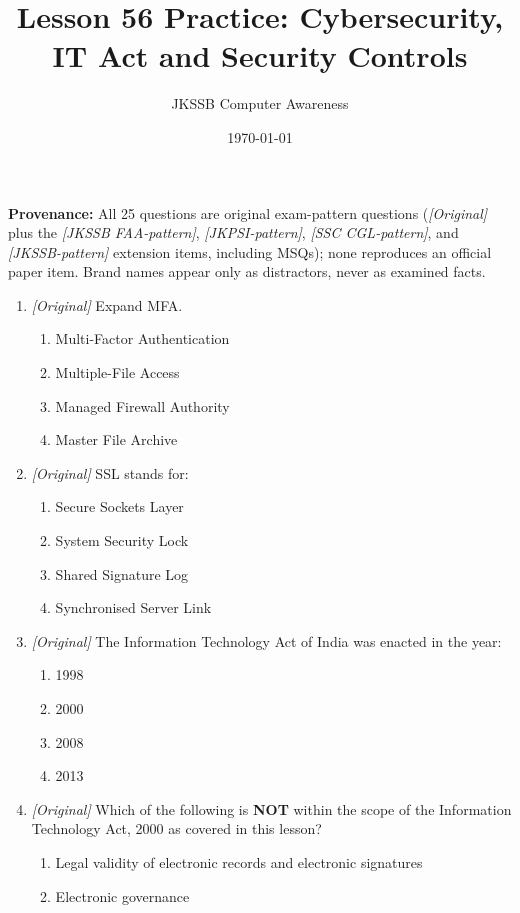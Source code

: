 \documentclass[11pt]{article}
\title{Lesson 56 Practice: Cybersecurity, IT Act and Security Controls}
\author{JKSSB Computer Awareness}
\date{\today}
\begin{document}
\maketitle
\noindent\textbf{Provenance:} All 25 questions are original exam-pattern questions (\textit{[Original]} plus the \textit{[JKSSB FAA-pattern]}, \textit{[JKPSI-pattern]}, \textit{[SSC CGL-pattern]}, and \textit{[JKSSB-pattern]} extension items, including MSQs); none reproduces an official paper item.
Brand names appear only as distractors, never as examined facts.

\begin{enumerate}[label=\textbf{Q\arabic*.}, leftmargin=*]
\item \textit{[Original]} Expand MFA.
  \begin{enumerate}[label=\Alph*.]
    \item Multi-Factor Authentication
    \item Multiple-File Access
    \item Managed Firewall Authority
    \item Master File Archive
  \end{enumerate}
\item \textit{[Original]} SSL stands for:
  \begin{enumerate}[label=\Alph*.]
    \item Secure Sockets Layer
    \item System Security Lock
    \item Shared Signature Log
    \item Synchronised Server Link
  \end{enumerate}
\item \textit{[Original]} The Information Technology Act of India was
  enacted in the year:
  \begin{enumerate}[label=\Alph*.]
    \item 1998
    \item 2000
    \item 2008
    \item 2013
  \end{enumerate}
\item \textit{[Original]} Which of the following is \textbf{NOT} within the
  scope of the Information Technology Act, 2000 as covered in this lesson?
  \begin{enumerate}[label=\Alph*.]
    \item Legal validity of electronic records and electronic signatures
    \item Electronic governance

\end{enumerate}
\end{enumerate}
\end{document}
